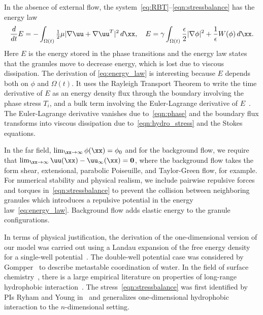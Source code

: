 In the absence of external flow, the
system~\eqref{eq:RBT}--\eqref{eqn:stressbalance} has the energy law
\begin{align}
\label{eq:energy_law}
  \frac{d}{dt}E
  = - \int_{\Omega(t)}\tfrac{1}{2}\mu|\nabla \uu + \nabla
  \uu^T|^2 \,d\xx,\quad
    E = \gamma \int_{\Omega(t)}
  \frac{\epsilon}{2} |\nabla \phi|^2 + \frac{1}{\epsilon} W(\phi) \,d\xx.
\end{align}
Here $E$ is the energy stored in the phase transitions
and the energy law states that
the granules move to decrease energy,
which is lost due to viscous dissipation.
The derivation of \eqref{eq:energy_law} is interesting
because $E$ depends both on $\phi$
and $\Omega(t)$. It uses the Rayleigh Transport Theorem to write the time
derivative of $E$ as an energy density flux through the boundary
involving the phase stress $T_i$, and a bulk term involving the Euler-Lagrange
derivative of $E$~\cite{Fu2018_SIAM}. The Euler-Lagrange derivative vanishes due
to~\eqref{eqn:phase} and the boundary flux transforms into viscous
dissipation due to~\eqref{eqn:hydro_stress} and the Stokes equations. 

In the far field, $\lim_{\xx \to \infty} \phi(\xx) = \phi_0$ and for the
background flow, we require that $\lim_{\xx \to \infty} \uu(\xx) -
\uu_{\infty}(\xx) = \mathbf{0}$, where
the background flow takes the form
shear, extensional, parabolic Poiseuille, and
Taylor-Green flow, for example.
For numerical stability and physical realism, we
include pairwise repulsive forces and torques
in~\eqref{eqn:stressbalance} to prevent the collision between
neighboring granules which introduces a repulsive potential in the energy
law~\eqref{eq:energy_law}. Background flow adds elastic energy to the
granule configurations.

In terms of physical justification, the derivation of the
one-dimensional version of our model was carried out using a Landau
expansion of the free energy density for a single-well
potential~\cite{MaRa76, ErLjCl89}. The double-well potential case was
considered by Gompper~\cite{GoHaKo94} to describe metastable
coordination of water. In the field of surface
chemistry~\cite{Israelachvili1954}, there is a large empirical
literature on properties of long-range hydrophobic
interaction~\cite{LeRaPa77, KoNa15, Nagle17, Lum1999, Lin2005,
Meyer2006, Ducker2016, Jackson2016, Gletal88, Aketal17, Ch05}. The
stress~\eqref{eqn:stressbalance} was first identified by PIs Ryham and
Young in~\cite{Fu2018_SIAM} and generalizes one-dimensional hydrophobic
interaction to the $n$-dimensional setting. 

